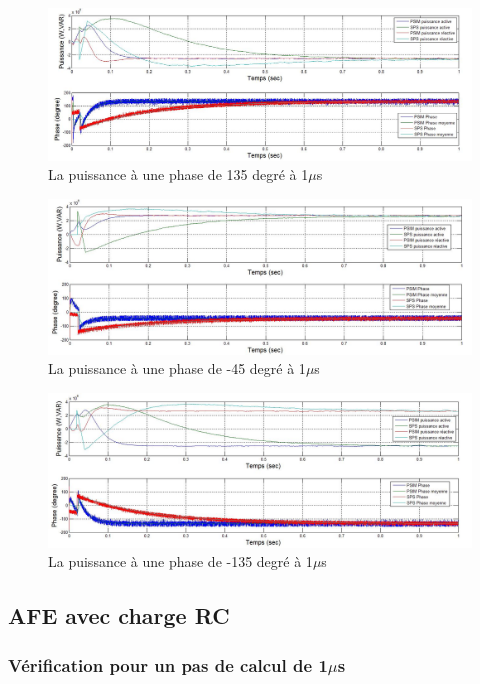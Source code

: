 \documentclass[11pt,letterpaper,final]{report}
\begin{document}
\begin{figure}[htb]
\centering
\includegraphics[scale=0.5]{Fig/AFEIDEAL/pui135.jpg}
\caption{La puissance à une phase de 135 degré à 1$\mu$s}
\label{AF_I_pui_135}
\end{figure}

\begin{figure}[htb]
\centering
\includegraphics[scale=0.5]{Fig/AFEIDEAL/pui_45.jpg}
\caption{La puissance à une phase de -45 degré à 1$\mu$s}
\label{AF_I_pui__45}
\end{figure}

\begin{figure}[htb]
\centering
\includegraphics[scale=0.5]{Fig/AFEIDEAL/pui_135.jpg}
\caption{La puissance à une phase de -135 degré à 1$\mu$s}
\label{AF_I_pui__135}
\end{figure}

\clearpage
\subsection{AFE avec charge RC}
\subsubsection{Vérification pour un pas de calcul de 1$\mu$s}
\end{document}
